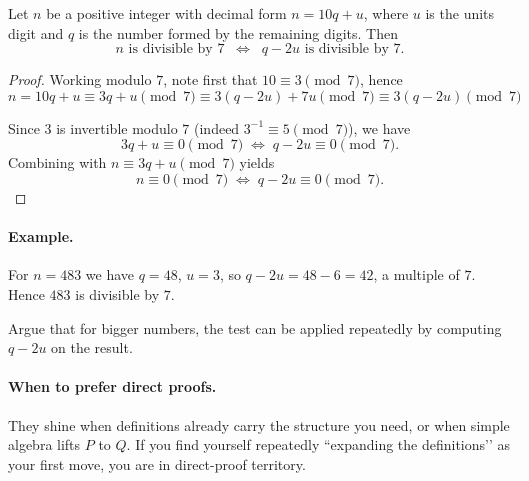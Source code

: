 \begin{theorem}
Let $n$ be a positive integer with decimal form $n=10q+u$, where $u$ is the units digit
and $q$ is the number formed by the remaining digits. Then
\[
n \text{ is divisible by } 7 \;\;\Longleftrightarrow\;\; q-2u \text{ is divisible by } 7.
\]
\end{theorem}

\begin{proof}
Working modulo $7$, note first that $10\equiv 3\pmod{7}$, hence
\[
n=10q+u \equiv 3q+u \pmod{7} \equiv 3(q-2u) + 7u \pmod{7}  \equiv  3(q-2u)  \pmod{7}
\]

Since $3$ is invertible modulo $7$ (indeed $3^{-1}\equiv 5\pmod{7}$), we have
\[
3q+u \equiv 0 \pmod{7} \;\Longleftrightarrow\; q-2u \equiv 0 \pmod{7}.
\]
Combining with $n \equiv 3q+u \pmod{7}$ yields
\[
n \equiv 0 \pmod{7} \;\Longleftrightarrow\; q-2u \equiv 0 \pmod{7}.
\]
%

\end{proof}

\paragraph{Example.}
For $n=483$ we have $q=48$, $u=3$, so $q-2u=48-6=42$, a multiple of $7$. Hence $483$ is divisible by $7$.

\begin{exercise} 
Argue that for bigger numbers, the test can be applied repeatedly by computing  $q-2u$ on the result.
\end{exercise}


\paragraph{When to prefer direct proofs.}
They shine when definitions already carry the structure you need, or when simple algebra lifts \(P\) to \(Q\). If you find yourself repeatedly “expanding the definitions’’ as your first move, you are in direct-proof territory.


